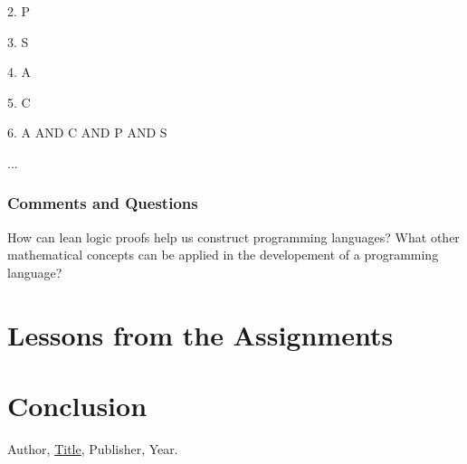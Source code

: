 \documentclass{article}
\theoremstyle{theorem}
\theoremstyle{definition}
\theoremstyle{remark}
\begin{document}
2. P

3. S

4. A

5. C

6. A AND C AND P AND S

...

\subsubsection*{Comments and Questions}

How can lean logic proofs help us construct programming languages? What other mathematical concepts can be applied in the developement of a programming language?

\section{Lessons from the Assignments}


\section{Conclusion}\label{conclusion}


\begin{thebibliography}{99}
 Author, \href{https://en.wikipedia.org/wiki/LaTeX}{Title}, Publisher, Year.
\end{thebibliography}
\end{document}
